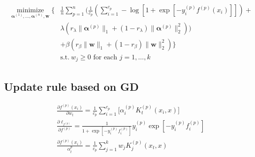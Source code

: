 \documentclass[a4paper]{article}
\DeclareMathOperator{\minimize}{minimize}
\begin{document}
\begin{align}
  \begin{split}
    \underset{\bm{\alpha}^{(1)}, \dots, \bm{\alpha}^{(n)}, \bm{w}}{\minimize}
    \bigg\{ & \frac{1}{n}\sum_{p=1}^n  \Bigg( \frac{1}{c_p}\left(\sum_{i=1}^{c_p} - \log\left[1 + \exp\left[-y_i^{(p)}f^{(p)}(x_i)\right]\right] \right)+\\
    &\lambda  \left(r_\lambda \|\bm{\alpha}^{(p)}\|_1+(1-r_\lambda)\|\bm{\alpha}^{(p)}\|_2^2\right) \Bigg)\\
    &+ \beta \left(r_\beta  \|\bm{w}\|_1 + (1-r_\beta)\|\bm{w}\|^2_2\right) \bigg\}\\
    & \text{s.t.}\ w_j \geq 0 \text{ for each } j=1,\dots,k
  \end{split}
\end{align}

\subsection{Update rule based on GD}
\begin{align}
  & \frac{\partial f^{(p)}(x_i)}{\partial w_t} = \frac{1}{c_p} \sum_{i=1}^{c_p}\Big[\alpha_i^{(p)} K_t^{(p)}(x_i, x)\Big] \\
  & \frac{\partial \ell_{f^{(p)}}}{\partial f^{(p)}} = \frac{1}{1+\exp\left[-y_i^{(p)}f^{(p)}_i\right]} y_i^{(p)}\exp\left[-y_i^{(p)}f^{(p)}_i\right] \\
  & \frac{\partial {f^{(p)}}(x_i) }{\alpha_t^{p}} = \frac{1}{c_p}\sum_{j=1}^k w_j K_j^{(p)}(x_t, x)
\end{align}
\end{document}
